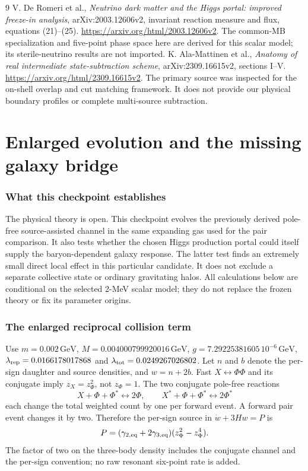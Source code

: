 \documentclass[11pt]{article}
\begin{document}
\begin{thebibliography}{9}
 V. De Romeri et al.,
\emph{Neutrino dark matter and the Higgs portal: improved freeze-in analysis},
arXiv:2003.12606v2, invariant reaction measure and flux, equations (21)--(25).
\url{https://arxiv.org/html/2003.12606v2}.
The common-MB specialization and five-point phase space here are derived
for this scalar model; its sterile-neutrino results are not imported.
 K. Ala-Mattinen et al.,
\emph{Anatomy of real intermediate state-subtraction scheme},
arXiv:2309.16615v2, sections I--V.
\url{https://arxiv.org/html/2309.16615v2}.
The primary source was inspected for the on-shell overlap and cut matching
framework. It does not provide our physical boundary profiles or complete
multi-source subtraction.
\end{thebibliography}

\clearpage

\part{Enlarged evolution and the missing galaxy bridge}

\section{What this checkpoint establishes}
The physical theory is open. This checkpoint evolves the previously derived
pole-free source-assisted channel in the same expanding gas used for the pair
comparison. It also tests whether the chosen Higgs production portal could
itself supply the baryon-dependent galaxy response. The latter test finds
an extremely small direct local effect in this particular candidate. It
does not exclude a separate collective state or ordinary gravitating halos.
All calculations below are conditional on the selected 2-MeV scalar model;
they do not replace the frozen theory or fix its parameter origins.

\section{The enlarged reciprocal collision term}
Use $m=0.002\,\mathrm{GeV}$, $M=0.004000799920016\,\mathrm{GeV}$,
$g=7.29225381605\,10^{-6}\,\mathrm{GeV}$,
$\lambda_{\rm rep}=0.0166178017868$ and
$\lambda_{\rm tot}=0.0249267026802$. Let $n$ and $b$ denote the
per-sign daughter and source densities, and $w=n+2b$. Fast
$X\leftrightarrow\Phi\Phi$ and its conjugate imply
$z_X=z_\Phi^2$, not $z_\Phi=1$. The two conjugate pole-free reactions
\begin{equation}
 X+\Phi+\Phi^*\leftrightarrow 2\Phi,
 \qquad X^*+\Phi+\Phi^*\leftrightarrow 2\Phi^*
\end{equation}
each change the total weighted count by one per forward event. A forward
pair event changes it by two. Therefore the per-sign source in
$\dot w+3Hw=P$ is
\begin{equation}
 P=(\gamma_{2,\rm eq}+2\gamma_{3,\rm eq})(z_\Phi^2-z_\Phi^4).
 \label{ag:collision}
\end{equation}
The factor of two on the three-body density includes the conjugate channel
and the per-sign convention; no raw resonant six-point rate is added.
\end{document}
